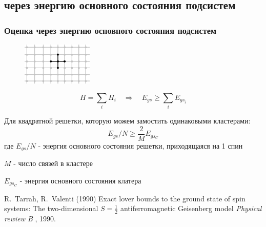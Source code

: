 \documentclass{beamer}
\begin{document}
\subsection{через энергию основного состояния подсистем}
\begin{frame}
\frametitle{Оценка через энергию основного состояния подсистем}
\begin{figure}
\includegraphics[width=0.3\textwidth]{lattice-crest.png}
\end{figure}

$$H=\sum_i H_i \quad \Rightarrow \quad E_{gs}\geqslant\sum_i E_{{gs}_i}$$

Для квадратной решетки, которую можем замостить одинаковыми кластерами:
$$E_{gs}/N \geqslant \frac{2}{M}E_{gs_C}$$
где $E_{gs}/N$ - энергия основного состояния решетки, приходящаяся на 1 спин

$M$ - число связей в кластере

$E_{gs_C}$ - энергия основного состояния клатера
\footnotesize{
\begin{thebibliography}{99}
 R.~Tarrah, R.~Valenti (1990)
\newblock Exact lover bounds to the ground state of spin systems: The two-dimensional $S=\frac12$ antiferromagnetic Geisenberg model
\newblock \emph{Physical rewiew B} , 1990.
\end{thebibliography}
}
\end{frame}

\end{document}
